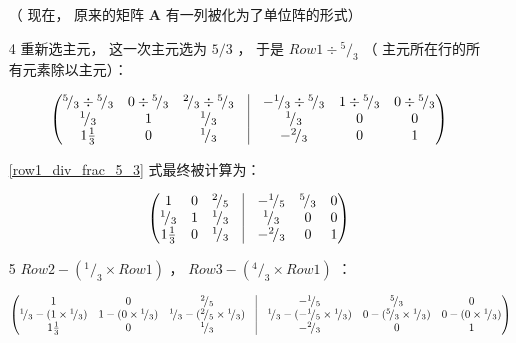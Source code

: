\documentclass[a4paper, 8pt]{article}
\newcommand{\matr}[1]{\mathbf{#1}}
\newcommand*\rfrac[2]{{}^{#1}\!/_{#2}}
\begin{document}
\begin{itemize}
（ 现在， 原来的矩阵 $\matr{A}$ 有一列被化为了单位阵的形式）

\item[4] 重新选主元， 这一次主元选为 $5/3$ ， 于是 $Row1 \div \rfrac{5}{3}$ （ 主元所在行的所有元素除以主元）：

\begin{equation} \label{row1_div_frac_5_3}
\begin{pmatrix}
\rfrac{5}{3} \div \rfrac{5}{3} & 0 \div \rfrac{5}{3} & \rfrac{2}{3} \div \rfrac{5}{3} & \vline & -\rfrac{1}{3} \div \rfrac{5}{3} &1 \div \rfrac{5}{3} & 0 \div \rfrac{5}{3} \\
\rfrac{1}{3} & 1 & \rfrac{1}{3} & \vline & \rfrac{1}{3} &0&0 \\
1\frac{1}{3} & 0 & \rfrac{1}{3} & \vline & -\rfrac{2}{3} &0&1
\end{pmatrix}
\end{equation}

\ref{row1_div_frac_5_3} 式最终被计算为：

\begin{equation} \label{row1_div_frac_5_3_result}
\begin{pmatrix}
1 & 0 & \rfrac{2}{5} & \vline & -\rfrac{1}{5} & \rfrac{5}{3} & 0 \\
\rfrac{1}{3} & 1 & \rfrac{1}{3} & \vline & \rfrac{1}{3} &0&0 \\
1\frac{1}{3} & 0 & \rfrac{1}{3} & \vline & -\rfrac{2}{3} &0&1
\end{pmatrix}
\end{equation}

\item[5] $Row2 - (\rfrac{1}{3} \times Row1)$ ， $Row3 - (\rfrac{4}{3} \times Row1)$ ：

\begin{equation} \label{row2_sub_frac_1_3mul_row1_andon}
\begin{pmatrix}
1 & 0 & \rfrac{2}{5} & \vline & -\rfrac{1}{5} & \rfrac{5}{3} & 0 \\
\rfrac{1}{3}-(1\times\rfrac{1}{3}) & 1-(0\times\rfrac{1}{3}) & \rfrac{1}{3}-(\rfrac{2}{5}\times\rfrac{1}{3}) & \vline & \rfrac{1}{3}-(-\rfrac{1}{5}\times\rfrac{1}{3}) &0-(\rfrac{5}{3}\times\rfrac{1}{3})&0-(0\times\rfrac{1}{3}) \\
1\frac{1}{3} & 0 & \rfrac{1}{3} & \vline & -\rfrac{2}{3} &0&1
\end{pmatrix}
\end{equation}


\end{itemize}
\end{document}
